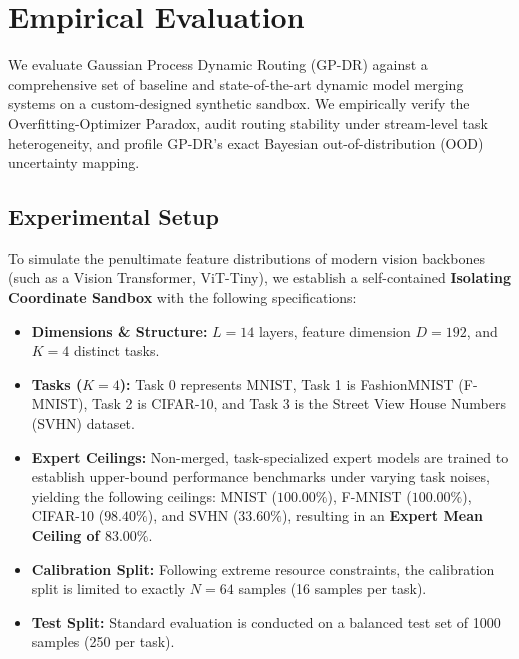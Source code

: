 \section{Empirical Evaluation}
\label{sec:experiments}

We evaluate Gaussian Process Dynamic Routing (GP-DR) against a comprehensive set of baseline and state-of-the-art dynamic model merging systems on a custom-designed synthetic sandbox. We empirically verify the Overfitting-Optimizer Paradox, audit routing stability under stream-level task heterogeneity, and profile GP-DR's exact Bayesian out-of-distribution (OOD) uncertainty mapping.

\subsection{Experimental Setup}
To simulate the penultimate feature distributions of modern vision backbones (such as a Vision Transformer, ViT-Tiny), we establish a self-contained \textbf{Isolating Coordinate Sandbox} with the following specifications:
\begin{itemize}
    \item \textbf{Dimensions \& Structure:} $L = 14$ layers, feature dimension $D = 192$, and $K = 4$ distinct tasks.
    \item \textbf{Tasks ($K=4$):} Task 0 represents MNIST, Task 1 is FashionMNIST (F-MNIST), Task 2 is CIFAR-10, and Task 3 is the Street View House Numbers (SVHN) dataset.
    \item \textbf{Expert Ceilings:} Non-merged, task-specialized expert models are trained to establish upper-bound performance benchmarks under varying task noises, yielding the following ceilings: MNIST ($100.00\%$), F-MNIST ($100.00\%$), CIFAR-10 ($98.40\%$), and SVHN ($33.60\%$), resulting in an \textbf{Expert Mean Ceiling of $83.00\%$}.
    \item \textbf{Calibration Split:} Following extreme resource constraints, the calibration split is limited to exactly $N = 64$ samples (16 samples per task).
    \item \textbf{Test Split:} Standard evaluation is conducted on a balanced test set of 1000 samples (250 per task).
\end{itemize}

